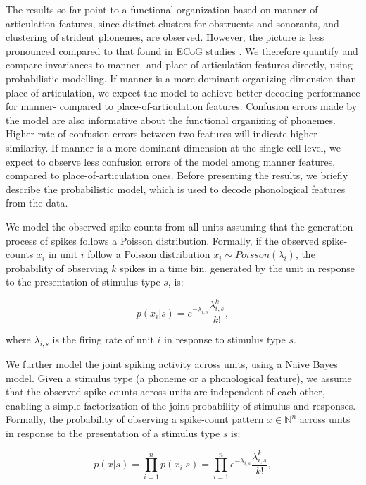 The results so far point to a functional organization based on manner-of-articulation features, since distinct clusters for obstruents and sonorants, and clustering of strident phonemes, are observed. However, the picture is less pronounced compared to that found in ECoG studies \citep{Mesgarani2014}. We therefore quantify and compare invariances to manner- and place-of-articulation features directly, using probabilistic modelling. If manner is a more dominant organizing dimension than place-of-articulation, we expect the model to achieve better decoding performance for manner- compared to place-of-articulation features. Confusion errors made by the model are also informative about the functional organizing of phonemes. Higher rate of confusion errors between two features will indicate higher similarity. If manner is a more dominant dimension at the single-cell level, we expect to observe less confusion errors of the model among manner features, compared to place-of-articulation ones. Before presenting the results, we briefly describe the probabilistic model, which is used to decode phonological features from the data.

We model the observed spike counts from all units assuming that the generation process of spikes follows a Poisson distribution. Formally, if the observed spike-counts $x_i$ in unit $i$ follow a Poisson distribution $x_i \sim Poisson(\lambda_i)$, the probability of observing $k$ spikes in a time bin, generated by the unit in response to the presentation of stimulus type $s$, is:

\begin{equation}
    p(x_i|s)=e^{-\lambda_{i,s}}\frac{\lambda_{i,s}^k}{k!},
\end{equation}

where $\lambda_{i,s}$ is the firing rate of unit $i$ in response to stimulus type $s$. 

We further model the joint spiking activity across units, using a Naive Bayes model. Given a stimulus type (a phoneme or a phonological feature), we assume that the observed spike counts across units are independent of each other, enabling a simple factorization of the joint probability of stimulus and responses. Formally, the probability of observing a spike-count pattern $x \in \mathbb{N}^n$ across units in response to the presentation of a stimulus type $s$ is:

\begin{equation}
    p(x|s)=\prod_{i=1}^n{p(x_i |s)}=\prod_{i=1}^n{e^{-\lambda_{i,s}}\frac{\lambda_{i,s}^k}{k!}},
\end{equation}

